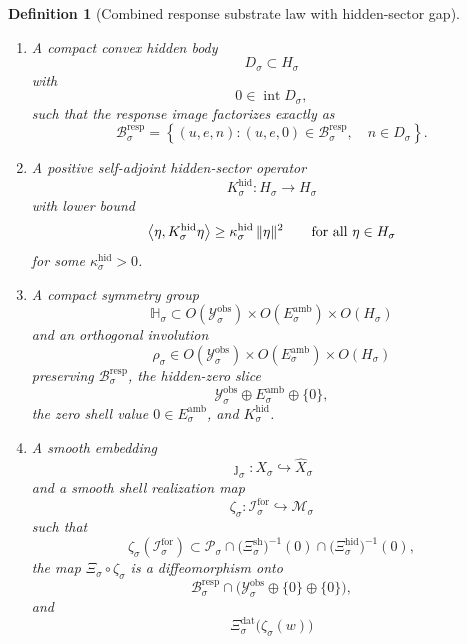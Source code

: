 \documentclass[11pt]{article}
\newcommand{\ForSpace}[1]{\mathcal I_{#1}^{\mathrm{for}}}
\newcommand{\VisibleAffine}[1]{\widehat X_{#1}}
\newcommand{\DataSpace}[1]{\mathcal Y_{#1}^{\mathrm{obs}}}
\newcommand{\AmbientTarget}[1]{E_{#1}^{\mathrm{amb}}}
\newcommand{\ProtoSpace}[1]{\mathcal M_{#1}}
\newcommand{\ProtoBody}[1]{\mathcal P_{#1}}
\newcommand{\ResponseMap}[1]{\Xi_{#1}}
\newcommand{\ResponseData}[1]{\Xi_{#1}^{\mathrm{dat}}}
\newcommand{\ResponseShell}[1]{\Xi_{#1}^{\mathrm{sh}}}
\newcommand{\ResponseHidden}[1]{\Xi_{#1}^{\mathrm{hid}}}
\newcommand{\ResponseImage}[1]{\mathcal B_{#1}^{\mathrm{resp}}}
\newcommand{\GapSpace}[1]{H_{#1}}
\newcommand{\GapBody}[1]{D_{#1}}
\newcommand{\HiddenOperator}[1]{K_{#1}^{\mathrm{hid}}}
\newcommand{\ResponseSym}[1]{\mathbb H_{#1}}
\newcommand{\ResponseTime}[1]{\rho_{#1}}
\newcommand{\ProtoEmbed}[1]{\zeta_{#1}}
\newtheorem{definition}{Definition}
\begin{document}
\begin{definition}[Combined response substrate law with hidden-sector gap]
\begin{enumerate}
    \[
    \DataSpace{\sigma}\oplus \AmbientTarget{\sigma}\oplus\{0\}.
    \]
    \item A compact convex hidden body
    \[
    \GapBody{\sigma}\subset \GapSpace{\sigma}
    \]
    with
    \[
    0\in\operatorname{int}\GapBody{\sigma},
    \]
    such that the response image factorizes exactly as
    \begin{equation}
    \ResponseImage{\sigma}
    =
    \left\{
    (u,e,n):
    (u,e,0)\in\ResponseImage{\sigma},
    \quad
    n\in\GapBody{\sigma}
    \right\}.
    \label{eq:responsefactor}
    \end{equation}
    \item A positive self-adjoint hidden-sector operator
    \[
    \HiddenOperator{\sigma}:\GapSpace{\sigma}\to\GapSpace{\sigma}
    \]
    with lower bound
    \begin{equation}
    \ev{\eta,\HiddenOperator{\sigma}\eta}
    \ge
    \kappa_{\sigma}^{\mathrm{hid}}\,
    \|\eta\|^{2}
    \qquad
    \text{for all }\eta\in\GapSpace{\sigma}
    \label{eq:combinedgap}
    \end{equation}
    for some \(\kappa_{\sigma}^{\mathrm{hid}}>0\).
    \item A compact symmetry group
    \[
    \ResponseSym{\sigma}\subset
    O(\DataSpace{\sigma})\times O(\AmbientTarget{\sigma})\times O(\GapSpace{\sigma})
    \]
    and an orthogonal involution
    \[
    \ResponseTime{\sigma}\in
    O(\DataSpace{\sigma})\times O(\AmbientTarget{\sigma})\times O(\GapSpace{\sigma})
    \]
    preserving \(\ResponseImage{\sigma}\), the hidden-zero slice
    \[
    \DataSpace{\sigma}\oplus \AmbientTarget{\sigma}\oplus\{0\},
    \]
    the zero shell value \(0\in \AmbientTarget{\sigma}\), and \(\HiddenOperator{\sigma}\).
    \item A smooth embedding
    \[
    \jmath_{\sigma}:X_{\sigma}\hookrightarrow \VisibleAffine{\sigma}
    \]
    and a smooth shell realization map
    \[
    \ProtoEmbed{\sigma}:\ForSpace{\sigma}\hookrightarrow \ProtoSpace{\sigma}
    \]
    such that
    \[
    \ProtoEmbed{\sigma}(\ForSpace{\sigma})
    \subset
    \ProtoBody{\sigma}\cap
    \bigl(\ResponseShell{\sigma}\bigr)^{-1}(0)\cap
    \bigl(\ResponseHidden{\sigma}\bigr)^{-1}(0),
    \]
    the map \(\ResponseMap{\sigma}\circ\ProtoEmbed{\sigma}\) is a diffeomorphism onto
    \[
    \ResponseImage{\sigma}\cap
    \bigl(
    \DataSpace{\sigma}\oplus\{0\}\oplus\{0\}
    \bigr),
    \]
    and
    \begin{equation}
    \ResponseData{\sigma}\bigl(\ProtoEmbed{\sigma}(w)\bigr)

\end{equation}
\end{enumerate}
\end{definition}
\end{document}
